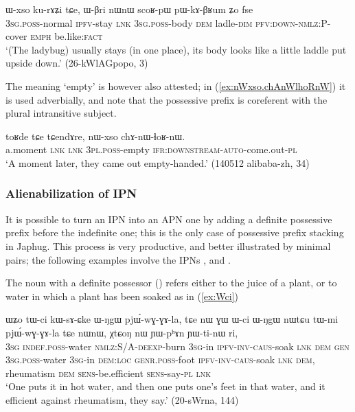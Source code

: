 \begin{exe}
\ex \label{ex:Wxso.kurAZi}
\gll  ɯ-xso ku-rɤʑi tɕe,  ɯ-βri nɯnɯ scoʁ-pɯ pɯ-kɤ-βʁum ʑo fse  \\
\textsc{3sg.poss}-normal \textsc{ipfv}-stay \textsc{lnk} \textsc{3sg.poss}-body \textsc{dem} ladle-\textsc{dim} \textsc{pfv}:\textsc{down}-\textsc{nmlz}:P-cover \textsc{emph} be.like:\textsc{fact} \\
\glt `(The ladybug) usually stays (in one place), its body looks like a little laddle put upside down.' (26-kWlAGpopo, 3)
\end{exe} 

The meaning `empty' is however also attested; in (\ref{ex:nWxso.chAnWlhoRnW}) it is used adverbially, and note that the possessive prefix is coreferent with the plural intransitive subject.

\begin{exe}
\ex \label{ex:nWxso.chAnWlhoRnW}
\gll toʁde tɕe tɕendɤre, nɯ-xso chɤ-nɯ-ɬoʁ-nɯ. \\
a.moment \textsc{lnk} \textsc{lnk} \textsc{3pl.poss}-empty \textsc{ifr}:\textsc{downstream}-\textsc{auto}-come.out-\textsc{pl} \\
\glt `A moment later, they came out empty-handed.' (140512 alibaba-zh, 34)
\end{exe} 

\subsubsection{Alienabilization of IPN} \label{sec:alienabilization}
 It is possible to turn an IPN  into an APN one by adding a definite possessive prefix before the indefinite one; this is the only case of possessive prefix stacking in Japhug. This process is very productive, and better illustrated by minimal pairs; the following examples involve the IPNs ,  and .
 
The noun  with a definite possessor () refers either to the juice of a plant, or to water in which a plant has been soaked as in (\ref{ex:Wci})

  \begin{exe}
\ex \label{ex:Wci}
 \gll  ɯʑo tɯ-ci kɯ-sɤ-ɕke ɯ-ŋgɯ pjɯ́-wɣ-ɣɤ-la, tɕe nɯ ɣɯ ɯ-ci ɯ-ŋgɯ nɯtɕu tɯ-mi pjɯ́-wɣ-ɣɤ-la tɕe nɯnɯ, χtɕoŋ nɯ ɲɯ-pʰɤn ɲɯ-ti-nɯ ri, \\
\textsc{3sg}  \textsc{indef.poss}-water \textsc{nmlz}:S/A-\textsc{deexp}-burn \textsc{3sg}-in \textsc{ipfv}-\textsc{inv}-\textsc{caus}-soak \textsc{lnk} \textsc{dem} \textsc{gen} \textsc{3sg.poss}-water \textsc{3sg}-in \textsc{dem:loc}  \textsc{genr.poss}-foot  \textsc{ipfv}-\textsc{inv}-\textsc{caus}-soak \textsc{lnk} \textsc{dem}, rheumatism \textsc{dem} \textsc{sens}-be.efficient \textsc{sens}-say-\textsc{pl} \textsc{lnk}  \\
 \glt `One puts it in hot water, and then one puts one's feet in that water, and it efficient against rheumatism, they say.' (20-sWrna, 144)
 \end{exe}

